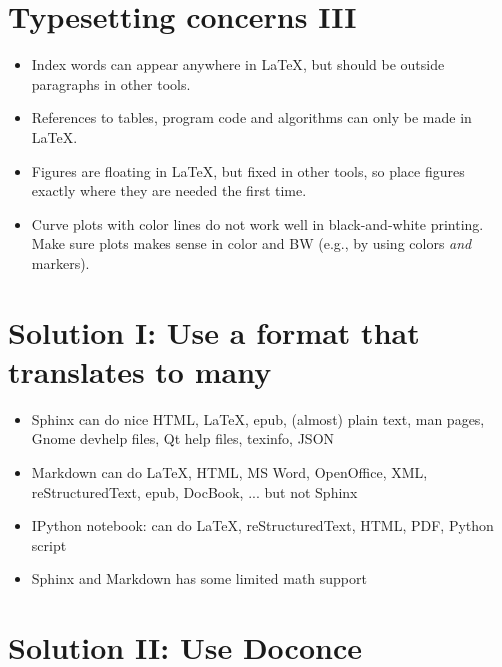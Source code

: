 \documentclass[%
twoside,                 %
draft,                   %
final,                   %
chapterprefix=true,      %
open=right               %
10pt]{book}
\begin{document}
\begin{shadedquoteBlue}

\section*{Typesetting concerns III}

\begin{itemize}
 \item Index words can appear anywhere in {\LaTeX}, but should be outside
   paragraphs in other tools.

 \item References to tables, program code and algorithms can only be
   made in {\LaTeX}.

 \item Figures are floating in {\LaTeX}, but fixed in other tools, so place
   figures exactly where they are needed the first time.

 \item Curve plots with color lines do not work well in black-and-white
   printing. Make sure plots makes sense in color and BW (e.g., by
   using colors \emph{and} markers).
\end{itemize}

\noindent

\section*{Solution I: Use a format that translates to many}

\begin{itemize}
 \item Sphinx can do nice HTML, {\LaTeX}, epub, (almost) plain text,
   man pages, Gnome devhelp files, Qt help files, texinfo, JSON

 \item Markdown can do {\LaTeX}, HTML, MS Word, OpenOffice, XML,
   reStructuredText, epub, DocBook, ... but not Sphinx

 \item IPython notebook: can do {\LaTeX}, reStructuredText, HTML, PDF,
   Python script

 \item Sphinx and Markdown has some limited math support
\end{itemize}

\noindent
\section*{Solution II: Use Doconce}


\end{shadedquoteBlue}
\end{document}
